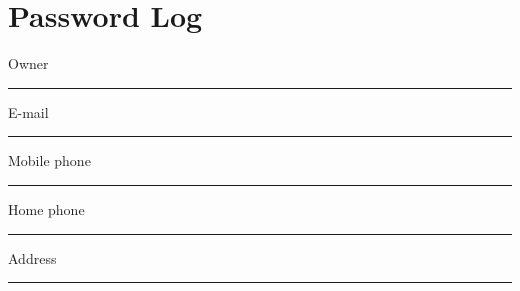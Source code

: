 \chapter*{Password Log}
\thispagestyle{empty}

Owner \
\vspace{-.1in} \\ \rule{\textwidth}{.2pt}
\vspace{.25in}

\noindent E-mail \
\vspace{-.1in} \\ \rule{\textwidth}{.2pt}
\vspace{.25in}

\noindent Mobile phone \
\vspace{-.1in} \\ \rule{\textwidth}{.2pt}
\vspace{.25in}

\noindent Home phone \
\vspace{-.1in} \\ \rule{\textwidth}{.2pt}
\vspace{.25in}

\noindent Address \
\vspace{-.1in} \\ \rule{\textwidth}{.2pt}


